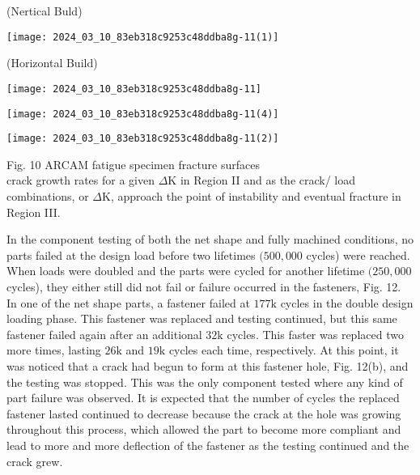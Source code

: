 \documentclass[10pt]{article}
\begin{document}
(Nertical Buld)

\begin{center}
\texttt{[image: 2024\_03\_10\_83eb318c9253c48ddba8g-11(1)]}
\end{center}

(Horizontal Build)

\begin{center}
\texttt{[image: 2024\_03\_10\_83eb318c9253c48ddba8g-11]}
\end{center}

\begin{center}
\texttt{[image: 2024\_03\_10\_83eb318c9253c48ddba8g-11(4)]}
\end{center}

\begin{center}
\texttt{[image: 2024\_03\_10\_83eb318c9253c48ddba8g-11(2)]}
\end{center}

Fig. 10 ARCAM fatigue specimen fracture surfaces\\
crack growth rates for a given $\Delta \mathrm{K}$ in Region II and as the crack/ load combinations, or $\Delta \mathrm{K}$, approach the point of instability and eventual fracture in Region III.

In the component testing of both the net shape and fully machined conditions, no parts failed at the design load before two lifetimes $(500,000$ cycles) were reached. When loads were doubled and the parts were cycled for another lifetime $(250,000$ cycles), they either still did not fail or failure occurred in the fasteners, Fig. 12. In one of the net shape parts, a fastener failed at $177 \mathrm{k}$ cycles in the double design loading phase. This fastener was replaced and testing continued, but this same fastener failed again after an additional $32 \mathrm{k}$ cycles. This faster was replaced two more times, lasting $26 \mathrm{k}$ and $19 \mathrm{k}$ cycles each time, respectively. At this point, it was noticed that a crack had begun to form at this fastener hole, Fig. 12(b), and the testing was stopped. This was the only component tested where any kind of part failure was observed. It is expected that the number of cycles the replaced fastener lasted continued to decrease because the crack at the hole was growing throughout this process, which allowed the part to become more compliant and lead to more and more deflection of the fastener as the testing continued and the crack grew.
\end{document}
